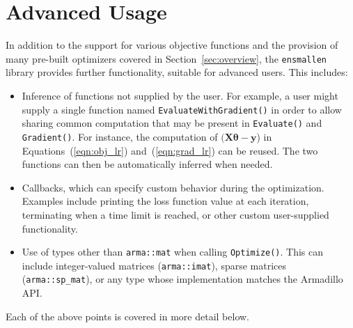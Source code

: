 \section{Advanced Usage}
\label{sec:advanced}

In addition to the support for various objective functions and
the provision of many pre-built optimizers covered in Section~\ref{sec:overview},
the {\tt ensmallen} library provides further functionality, suitable for advanced users.
This includes:

\begin{itemize}

\item
Inference of functions not supplied by the user.
For example, a user might supply a single function named
{\tt EvaluateWithGradient()}
in order to allow sharing common computation that may be 
present in {\tt Evaluate()} and {\tt Gradient()}.
For instance, the computation of $(\bm X \bm \theta - \bm y$)
in Equations~(\ref{eqn:obj_lr}) and~(\ref{eqn:grad_lr}) can be reused.
The two functions can then be automatically inferred when needed.

\item
Callbacks, which can specify custom behavior during the optimization.
Examples include printing the loss function value at each iteration,
terminating when a time limit is reached,
or other custom user-supplied functionality.

\item
Use of types other than {\tt arma::mat} when calling {\tt Optimize()}.
This can include
integer-valued matrices ({\tt arma::imat}),
sparse matrices ({\tt arma::sp\_mat}),
or any type whose implementation matches the Armadillo API.

\end{itemize}

Each of the above points is covered in more detail below.

